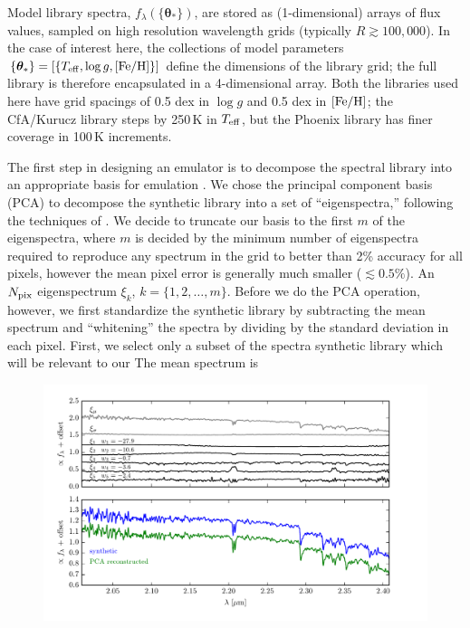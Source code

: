 \documentclass[iop,floatfix,twocolappendix]{emulateapj}
\newcommand{\Z}{[{\rm Fe}/{\rm H}]}
\newcommand{\vt}{ {\bm \theta}}
\begin{document}
Model library spectra, $f_{\lambda}(\{\vt_{\ast}\})$, are stored as (1-dimensional) arrays of flux 
values, sampled on high resolution wavelength grids (typically $R \gtrsim 100,000$).  In the case 
of interest here, the collections of model parameters $\{\vt_{\ast}\} = [\{T_{\rm eff}, \log g,  \Z 
\}]$ define the dimensions of the library grid; the full library is therefore encapsulated in a 
4-dimensional array.  Both the libraries used here have grid spacings of 0.5 dex in $\log g$ and 
0.5 dex in $\Z$; the {\sc CfA/Kurucz} library steps by 250\,K in $T_{\rm eff}$, but the {\sc 
Phoenix} library has finer coverage in 100\,K increments.  

The first step in designing an emulator is to decompose the spectral library into an appropriate basis for emulation \citep{habib07, heitmann09}. We chose the principal component basis (PCA) to decompose the synthetic library into a set of ``eigenspectra,'' following the techniques of \citet{ivezic13}. We decide to truncate our basis to the first $m$ of the eigenspectra, where $m$ is decided by the minimum number of eigenspectra required to reproduce any spectrum in the grid to better than 2\% accuracy for all pixels, however the mean pixel error is generally much smaller ($\lesssim 0.5\%$). An $N_{\rm pix}$ eigenspectrum $\xi_k$, $k = \{1, 2, \ldots, m\}$. Before we do the PCA operation, however, we first standardize the synthetic library by subtracting the mean spectrum and ``whitening'' the spectra by dividing by the standard deviation in each pixel. First, we select only a subset of the spectra synthetic library which will be relevant to our  The mean spectrum is 


\begin{figure}[!t]
  \begin{center}
  \includegraphics{figs/pca_reconstruct.pdf}
  \end{center}
\end{figure}
\end{document}
